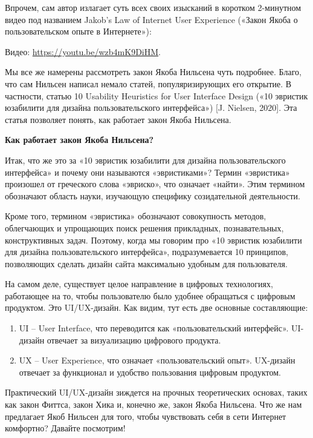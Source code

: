Впрочем, сам автор излагает суть всех своих изысканий в коротком 2-минутном видео под названием Jakob’s Law of Internet User Experience («Закон Якоба о пользовательском опыте в Интернете»):

\begin{fancyquotes}
    Видео: \url{https://youtu.be/wzb4mK9DiHM}.
\end{fancyquotes}

Мы все же намерены рассмотреть закон Якоба Нильсена чуть подробнее. Благо, что сам Нильсен написал немало статей, популяризирующих его открытие. В частности, статью 10 Usability Heuristics for User Interface Design («10 эвристик юзабилити для дизайна пользовательского интерфейса») [J. Nielsen, 2020]. Эта статья позволяет понять, как работает закон Якоба Нильсена.

\textbf{Как работает закон Якоба Нильсена?}

Итак, что же это за «10 эвристик юзабилити для дизайна пользовательского интерфейса» и почему они называются «эвристиками»? Термин «эвристика» произошел от греческого слова «эвриско», что означает «найти». Этим термином обозначают область науки, изучающую специфику созидательной деятельности.

Кроме того, термином «эвристика» обозначают совокупность методов, облегчающих и упрощающих поиск решения прикладных, познавательных, конструктивных задач. Поэтому, когда мы говорим про «10 эвристик юзабилити для дизайна пользовательского интерфейса», подразумевается 10 принципов, позволяющих сделать дизайн сайта максимально удобным для пользователя.

На самом деле, существует целое направление в цифровых технологиях, работающее на то, чтобы пользователю было удобнее обращаться с цифровым продуктом. Это UI/UX-дизайн. Как видим, тут есть две основные составляющие:

\begin{enumerate}
    \item UI – User Interface, что переводится как «пользовательский интерфейс». UI-дизайн отвечает за визуализацию цифрового продукта.
    \item UX – User Experience, что означает «пользовательский опыт». UX-дизайн отвечает за функционал и удобство пользования цифровым продуктом.
\end{enumerate}

Практический UI/UX-дизайн зиждется на прочных теоретических основах, таких как закон Фиттса, закон Хика и, конечно же, закон Якоба Нильсена. Что же нам предлагает Якоб Нильсен для того, чтобы чувствовать себя в сети Интернет комфортно? Давайте посмотрим!

